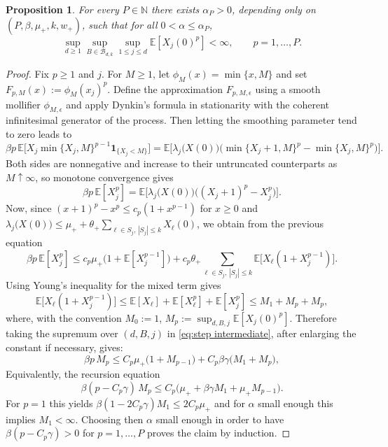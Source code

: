 \documentclass{article}
\newtheorem{proposition}{Proposition}[section]
\newcommand{\E}{\mathbb{E}}
\begin{document}
\begin{proposition}
\label{prop:moments}
For every $P\in\mathbb N$ there exists $\alpha_P>0$, depending only on $(P,\beta,\mu_+,k,w_+)$, such that for all $0<\alpha\le \alpha_P$,
\[
\sup_{d\ge 1}\sup_{B\in\mathcal B_{d,k}}\sup_{1\le j\le d}\E[X_j(0)^p]<\infty,
\qquad p=1,\dots,P.
\]
\end{proposition}
\begin{proof}
Fix $p\ge 1$ and $j$. For $M\ge 1$, let $\phi_M(x)=\min\{x, M\}$ and set $
F_{p,M}(x):=\phi_M(x_j)^p$. Define the approximation $F_{p,M,\epsilon}$ using a smooth mollifier $\phi_{M,\epsilon}$ and apply Dynkin's formula in stationarity with the coherent infinitesimal generator of the process.
Then letting the smoothing parameter tend to zero leads to
\begin{equation*}
\label{eq:moment-recursion-trunc}
\beta p\,\E\!\Big[X_j \min\{X_j, M\}^{p-1}\mathbf 1_{\{X_j<M\}}\Big]
=
\E\Big[\lambda_j\bigl(X(0)\bigr)\bigl(\min\{X_j+1, M\}^p-\min\{X_j, M\}^p\bigl)\Big].
\end{equation*}
Both sides are nonnegative and increase to their untruncated counterparts as $M\uparrow\infty$, so monotone convergence gives
\begin{equation*}
\label{eq:moment-recursion-base}
\beta p\,\E[X_j^p]
=
\E\Big[\lambda_j\bigl(X(0)\bigr)\big((X_j+1)^p-X_j^p\big)\Big].
\end{equation*}
Now, since $(x+1)^p-x^p\le c_p(1+x^{p-1})$ for $x\ge 0$ and
$ \lambda_j\bigl(X(0)\bigr)\le \mu_+ + \theta_+\sum_{\ell\in S_j,\,|S_j|\le k}X_\ell(0)$, we obtain from the previous equation
\begin{equation}
\label{eq:step intermediate}
\beta p\,\E[X_j^p]
\le c_p\mu_+\bigl(1+\E[X_j^{p-1}]\bigr)
+ c_p\theta_+\sum_{\ell\in S_j,\,|S_j|\le k}\E\bigl[X_\ell(1+X_j^{p-1})\bigr].
\end{equation}
Using Young's inequality for the mixed term gives
\[
\E\bigl[X_\ell(1+X_j^{p-1})\bigr]
\le \E[X_\ell] + \E[X_\ell^p]+\E[X_j^p] \le M_1 + M_p + M_p,
\]
where, with the convention $M_0:=1$, $M_p:=\sup_{d,B,j}\E[X_j(0)^p]$.
Therefore taking the supremum over $(d,B,j)$ in \eqref{eq:step intermediate}, after enlarging the constant if necessary, gives:
\[
\beta p\,M_p
\le C_p\mu_+\bigl(1+M_{p-1}\bigr)+C_p\beta\gamma\bigl(M_1+M_p\bigr),
\]
Equivalently, the recursion equation
\[
\beta (p-C_p\gamma)\,M_p
\le C_p\bigl(\mu_+ + \beta \gamma M_1 + \mu_+ M_{p-1}\bigr).
\]
For $p=1$ this yields $\beta(1-2C_p\gamma)M_1\le 2C_p\mu_+$ and for $\alpha$ small enough this implies $M_1<\infty$. Choosing then $\alpha$ small enough in order to have $\beta (p-C_p\gamma)>0$ for $p=1,\dots,P$ proves the claim by induction.
\end{proof}
\end{document}
